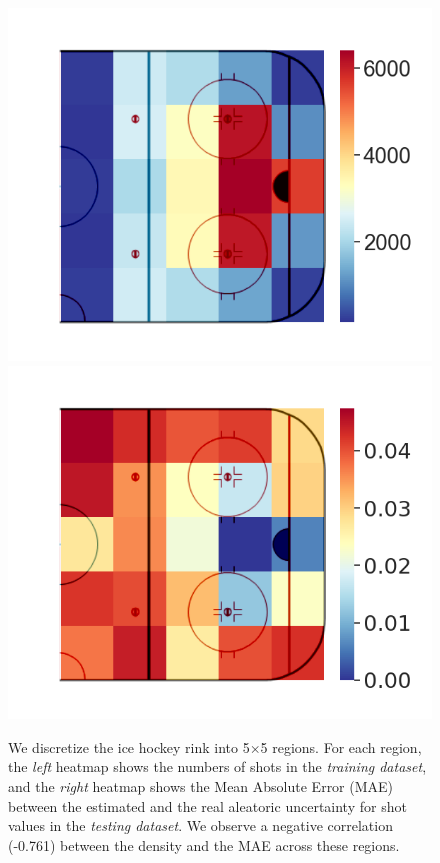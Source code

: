 \documentclass{article}
\begin{document}
\begin{figure}[htbp]
    \includegraphics[scale=0.2]{figures/spatial_train_num_blend.png}
    \includegraphics[scale=0.2]{figures/spatial_std_diff_blend.png}
    \vspace{-0.3in}
    \caption{We discretize the ice hockey rink into 5$\times$5 regions. For each region, the {\it left} heatmap shows the numbers of shots in the {\it training dataset}, and the {\it right} heatmap shows the Mean Absolute Error (MAE) between the estimated and the real aleatoric uncertainty for shot values in the {\it testing dataset}. We observe a negative correlation (-0.761) between the density and the MAE across these regions.}
    \label{fig:spatial-uncertainty}
    \vspace{-0.1in}
\end{figure}
\end{document}
